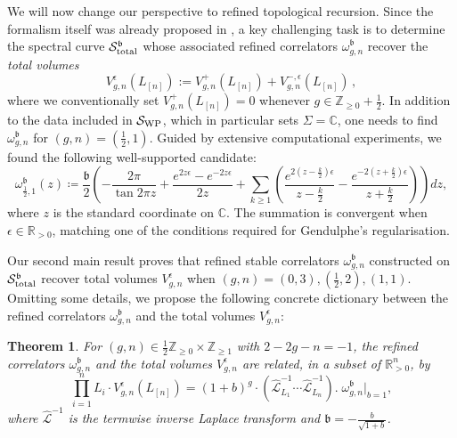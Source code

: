 \documentclass[12pt]{amsart}
\theoremstyle{plain}
\newtheorem{theorem}{Theorem}[section]
\theoremstyle{definition}
\theoremstyle{remark}
\numberwithin{equation}{section}
\begin{document}
\medskip






We will now change our perspective to refined topological recursion. Since the formalism itself was already proposed in \cite{KO22,Osu23-1}, a key challenging task is to determine the spectral curve $\mathcal{S}^\mathfrak{b}_{\rm total}$ whose associated refined correlators $\omega_{g,n}^\mathfrak{b}$ recover the \emph{total volumes} \[V_{g,n}^{\epsilon}(L_{[n]}):=V_{g,n}^{+}(L_{[n]})+V_{g,n}^{-,\epsilon}(L_{[n]})\,,\]
where we conventionally set $V_{g,n}^{+}(L_{[n]})=0$ whenever $g\in\mathbb{Z}_{\geq0}+\frac12$. In addition to the data included in $\mathcal{S}_{\rm WP}$, which in particular sets $\Sigma=\mathbb{C}$, one needs to find $\omega^\mathfrak{b}_{g,n}$ for $(g,n)=(\frac12,1)$. Guided by extensive computational experiments, we found the following well-supported candidate:
\[\omega_{\frac12,1}^\mathfrak{b}(z)\coloneqq\frac{\mathfrak{b}}{2}\left(-\frac{2\pi}{\tan2\pi z}+\frac{e^{2z\epsilon}-e^{-2z\epsilon}}{2z}+\sum_{k\geq1}\left(\frac{e^{2(z-\frac{k}{2})\epsilon}}{z-\frac{k}{2}}-\frac{e^{-2(z+\frac{k}{2})\epsilon}}{z+\frac{k}{2}}\right)\right)dz,\]
where $z$ is the standard coordinate on $\mathbb{C}$. The summation is convergent when $\epsilon\in\mathbb{R}_{>0}$, matching one of the conditions required for Gendulphe's regularisation. 

Our second main result proves that refined stable correlators $\omega_{g,n}^\mathfrak{b}$ constructed on $\mathcal{S}^\mathfrak{b}_{\rm total}$ recover total volumes $V_{g,n}^{\epsilon}$ when $(g,n)=(0,3), (\frac12,2), (1,1)$. Omitting some details, we propose the following concrete dictionary between the refined correlators $\omega_{g,n}^\mathfrak{b}$ and the total volumes $V_{g,n}^{\epsilon}$:

\begin{theorem}\label{thm:intro3}
For $(g,n)\in\frac12\mathbb{Z}_{\geq0}\times \mathbb{Z}_{\geq1}$ with $2-2g-n=-1$, the refined correlators $\omega_{g,n}^\mathfrak{b}$ and the total volumes $V_{g,n}^{\epsilon}$ are related, in a subset of $\mathbb{R}_{>0}^n$, by
\[  \prod_{i=1}^nL_i\cdot V_{g,n}^\epsilon(L_{[n]})= (1+b)^{g}\cdot (\hat{\mathcal{L}}_{L_1}^{-1}\cdots \hat{\mathcal{L}}_{L_n}^{-1}).\;\omega^\mathfrak{b}_{g,n}\Big|_{b=1},\]
where $\hat{\mathcal{L}}^{-1}$ is the termwise inverse Laplace transform and $\mathfrak{b}=-\frac{b}{\sqrt{1+b}}$.
\end{theorem}
\end{document}
